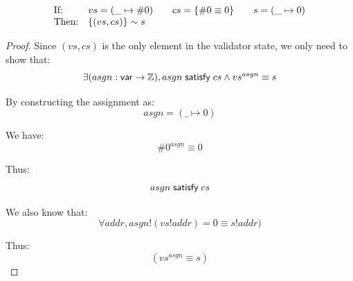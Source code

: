 \begin{lemma}[\ref{eq:rs1}]
\[\begin{array}{ll}
\text{If:}&
vs=(\_\mapsto\#0)\qquad
cs=\{\#0\equiv0\}\qquad
s=(\_\mapsto0)\\
\text{Then:}&\{(vs,cs)\}\sim s
\end{array}\]
\end{lemma}
\begin{proof}
Since $(vs,cs)$ is the only element in the validator state, we only need to show
that:
\[\exists(asgn:\mathsf{var}\to\mathbb Z),asgn\;\mathsf{satisfy}\;cs\wedge vs^{asgn}\equiv s\]

By constructing the assignment as: \[asgn=(\_\mapsto0)\]

We have: \[\#0^{asgn}\equiv0\]

Thus: \[asgn\;\mathsf{satisfy}\;cs\]

We also know that: \[\forall addr, asgn!(vs!addr)=0\equiv s!addr)\]

Thus: \[(vs^{asgn}\equiv s)\]
\end{proof}

